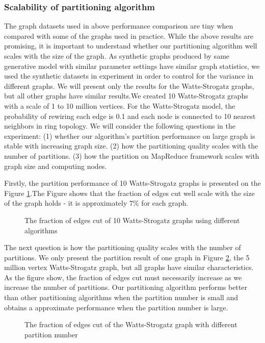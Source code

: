 \documentclass{acm_proc_article-sp}
\begin{document}
\subsubsection{Scalability of partitioning algorithm}
The graph datasets used in above performance comparison are tiny when compared with some of the graphs used in practice. While the above results are promising, it is important to understand whether our partitioning algorithm well scales with the size of the graph. As synthetic graphs produced by same generative model with similar parameter settings have similar graph statistics, we used the synthetic datasets in experiment in order to control for the variance in different graphs. We will present only the results for the Watts-Strogatz graphs, but all other graphs have similar results.We created 10 Watts-Strogatz graphs with a scale of 1 to 10 million vertices. For the Watts-Strogatz model, the probability of rewiring each edge is 0.1 and each node is connected to 10 nearest neighbors in ring topology. We will consider the following questions in the experiment: (1) whether our algorithm's partition performance on large graph is stable with increasing graph size. (2) how the partitioning quality scales with the number of partitions. (3) how the partition on MapReduce framework scales with graph size and computing nodes.
\par
Firstly, the partition performance of 10 Watts-Strogatz graphs is presented on the Figure \ref{fig:datasize}.The Figure shows that the fraction of edges cut well scale with the size of the graph holds - it is approximately $7\%$ for each graph.
\begin{figure}
\centering
{}
\caption{The fraction of edges cut of 10 Watts-Strogatz graphs using different algorithms}
\label{fig:datasize}
\end{figure}

The next question is how the partitioning quality scales with the number of partitions. We only present the partition result of one graph in Figure \ref{fig:parNum}, the 5 million  vertex Watts-Strogatz graph, but all graphs have similar characteristics. As the figure show, the fraction
of edges cut must necessarily increase as we increase the number of partitions. Our partitioning algorithm performs better than other partitioning algorithms when the partition number is small and obtains a approximate performance when the partition number is large.
\begin{figure}
\centering
{}
\caption{The fraction of edges cut of the Watts-Strogatz graph with different partition number}
\label{fig:parNum}
\end{figure}
\end{document}
